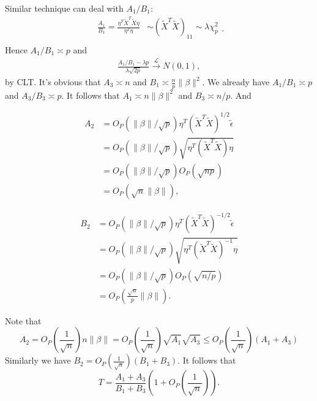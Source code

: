\documentclass[review]{elsarticle}
\theoremstyle{plain}
\theoremstyle{definition}
\theoremstyle{remark}
\begin{document}
Similar technique can deal with $A_1/B_1$:
\begin{equation*}
    \begin{aligned}
        \frac{A_1}{B_1}=\frac{\eta^T \tilde{X}^T\tilde{X} \eta    
        }{\eta^T\eta}&\sim {(\tilde{X}^T\tilde{X})}_{11}\sim \lambda \chi^2_{p}
\\
    \end{aligned}.
\end{equation*}
Hence $A_1/B_1\asymp p$ and 
\begin{equation*}
    \begin{aligned}
        \frac{A_1/B_1
    -\lambda p}{\lambda\sqrt{2p}
        }\xrightarrow{\mathcal{L}}N(0,1),
    \end{aligned}
\end{equation*}
by CLT.\@
It's obvious that $A_3\asymp n$ and $B_1\asymp \frac{n}{p}\|\beta\|^2$. We already have $A_1/B_1\asymp p$ and $A_3/B_3\asymp p$. It follows that $A_1\asymp n\|\beta\|^2$ and $B_3\asymp n/p$. And

\begin{equation*}
    \begin{aligned}
        A_2&=O_P(\|\beta\|/{\sqrt{p}})\eta^T {(\tilde{X}^T\tilde{X})}^{1/2}\tilde{\epsilon}\\
        &=O_P(\|\beta\|/\sqrt{p})\sqrt{\eta^T{(\tilde{X}^T\tilde{X})}\eta}\\
        &=O_P(\|\beta\|/\sqrt{p})O_P(\sqrt{np})\\
        &=O_P(\sqrt{n}\|\beta\|),
    \end{aligned}
\end{equation*}

\begin{equation*}
    \begin{aligned}
        B_2&=O_P(\|\beta\|/{\sqrt{p}})\eta^T {(\tilde{X}^T\tilde{X})}^{-1/2}\tilde{\epsilon}\\
        &=O_P(\|\beta\|/\sqrt{p})\sqrt{\eta^T{(\tilde{X}^T\tilde{X})}^{-1}\eta}\\
        &=O_P(\|\beta\|/\sqrt{p})O_P(\sqrt{n/p})\\
        &=O_P(\frac{\sqrt{n}}{p}\|\beta\|).
    \end{aligned}
\end{equation*}

Note that 
\begin{equation*}
A_2=O_P(\frac{1}{\sqrt{n}})n\|\beta\|=O_P(\frac{1}{\sqrt{n}})\sqrt{A_1}\sqrt{A_3}
        \leq O_P(\frac{1}{\sqrt{n}})(A_1+A_3)
\end{equation*}
Similarly we have $B_2=O_P(\frac{1}{\sqrt{n}})(B_1+B_3)$. It follows that
\begin{equation}\label{TAB}
    T=\frac{A_1+A_3}{B_1+B_3}(1+O_P(\frac{1}{\sqrt{n}})).
\end{equation}
\end{document}
